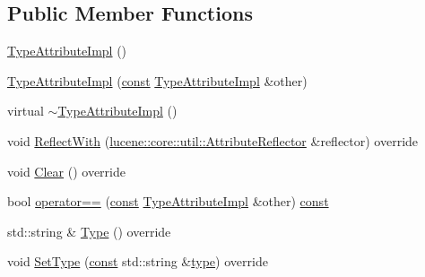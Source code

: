 \subsection*{Public Member Functions}
\begin{DoxyCompactItemize}
\item 
\mbox{\hyperlink{classlucene_1_1core_1_1analysis_1_1tokenattributes_1_1TypeAttributeImpl_a49d2f823e9f9e40eaf4778ca6c891004}{Type\+Attribute\+Impl}} ()
\item 
\mbox{\hyperlink{classlucene_1_1core_1_1analysis_1_1tokenattributes_1_1TypeAttributeImpl_ac175daf0cfddc86eab6614ff77407535}{Type\+Attribute\+Impl}} (\mbox{\hyperlink{ZlibCrc32_8h_a2c212835823e3c54a8ab6d95c652660e}{const}} \mbox{\hyperlink{classlucene_1_1core_1_1analysis_1_1tokenattributes_1_1TypeAttributeImpl}{Type\+Attribute\+Impl}} \&other)
\item 
virtual \mbox{\hyperlink{classlucene_1_1core_1_1analysis_1_1tokenattributes_1_1TypeAttributeImpl_abdcbb50bdbabafbee791c5fc9fa0e14d}{$\sim$\+Type\+Attribute\+Impl}} ()
\item 
void \mbox{\hyperlink{classlucene_1_1core_1_1analysis_1_1tokenattributes_1_1TypeAttributeImpl_a7194a1e268786f0a45e77b1204246727}{Reflect\+With}} (\mbox{\hyperlink{namespacelucene_1_1core_1_1util_a7dbb701adaed055f73fb95eec83da10a}{lucene\+::core\+::util\+::\+Attribute\+Reflector}} \&reflector) override
\item 
void \mbox{\hyperlink{classlucene_1_1core_1_1analysis_1_1tokenattributes_1_1TypeAttributeImpl_a373559195f408497ab81408bab95a2b1}{Clear}} () override
\item 
bool \mbox{\hyperlink{classlucene_1_1core_1_1analysis_1_1tokenattributes_1_1TypeAttributeImpl_a7cce374ec3d71e3ea220a7d8f8a33aef}{operator==}} (\mbox{\hyperlink{ZlibCrc32_8h_a2c212835823e3c54a8ab6d95c652660e}{const}} \mbox{\hyperlink{classlucene_1_1core_1_1analysis_1_1tokenattributes_1_1TypeAttributeImpl}{Type\+Attribute\+Impl}} \&other) \mbox{\hyperlink{ZlibCrc32_8h_a2c212835823e3c54a8ab6d95c652660e}{const}}
\item 
std\+::string \& \mbox{\hyperlink{classlucene_1_1core_1_1analysis_1_1tokenattributes_1_1TypeAttributeImpl_a612a5d915d4f189c5c4563f1a2358253}{Type}} () override
\item 
void \mbox{\hyperlink{classlucene_1_1core_1_1analysis_1_1tokenattributes_1_1TypeAttributeImpl_a237875b669558ea7d58b6fa0b46a16a1}{Set\+Type}} (\mbox{\hyperlink{ZlibCrc32_8h_a2c212835823e3c54a8ab6d95c652660e}{const}} std\+::string \&\mbox{\hyperlink{classlucene_1_1core_1_1analysis_1_1tokenattributes_1_1TypeAttributeImpl_ad5781cf6585610066317c74d5d4a4f1c}{type}}) override

\end{DoxyCompactItemize}
